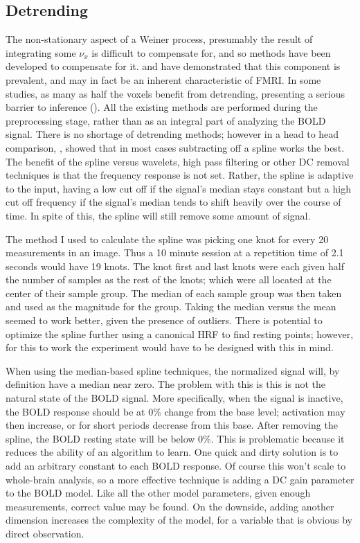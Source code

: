\subsection{Detrending}
\label{sec:Detrend}
The non-stationary
aspect of a Weiner process, presumably the result of integrating some
$\nu_x$ is difficult to compensate for, and so methods
have been developed to compensate for it. \cite{Tanabe2002} and \cite{Smith1999} have
demonstrated that this component is prevalent, and may in fact be an inherent  characteristic
of FMRI. In some studies, as many as half the voxels benefit from detrending, presenting
a serious barrier to inference (\cite{Smith2007}). All the existing methods are performed
during the preprocessing stage, rather than as an integral part of analyzing the BOLD
signal. There is no shortage of detrending methods; however
in a head to head comparison, \cite{Tanabe2002}, showed that in most cases subtracting off
a spline works the best. The benefit of the spline versus wavelets, high pass 
filtering or other DC removal techniques is that the frequency response is not set.
Rather, the spline is adaptive to the input, having a low cut off if the signal's 
median stays constant but a high cut off frequency if the signal's median tends to
shift heavily over the course of time. In spite of this, the spline will still remove some
amount of signal.

The method I used to calculate the spline was picking one knot for every 20
measurements in an image. Thus a 10 minute session at a repetition time of 
2.1 seconds would have 19 knots. The knot first and last knots were each 
given half the number of samples as the rest of the knots; which were all 
located at the center of their sample group. The median of each sample group
was then taken and used as the magnitude for the group. Taking the median 
versus the mean seemed to work better, given the presence of outliers. 
There is potential to optimize the spline further using a canonical 
HRF to find resting points; however, for this to work the experiment would have
to be designed with this in mind. 

When using the median-based spline techniques, the normalized signal will,
by definition have a median near zero. 
The problem with this is this is not the natural state of the BOLD signal. More specifically,
when the signal is inactive, the BOLD response should be at 0\% change from
the base level; activation may then increase, or for short periods decrease from this base.
After removing the spline, the BOLD resting state will be below 0\%.
This is problematic because it reduces the ability of an algorithm to learn.
One quick and dirty solution is to add an arbitrary constant to each BOLD response. 
Of course this won't scale to whole-brain analysis, so a more effective technique 
is adding a DC gain parameter to the BOLD model. 
Like all the other model parameters, given enough measurements, correct
value may be found. On the downside, adding another dimension increases the
complexity of the model, for a variable that is obvious by direct
observation.

